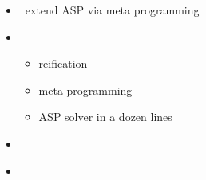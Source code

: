 \begin{frame}{\metasp}
  \begin{itemize}
  \item {} \ extend ASP via meta programming
  \item {} \
    \begin{itemize}
    \item reification
    \item meta programming
    \item ASP solver in a dozen lines
    \end{itemize}
  \item {}   \ \cite{gekasc11b,karoscwa21a}
  \item {} \ \cite{brderosc15b,digelurosc18a}
  \end{itemize}
\end{frame}
%

